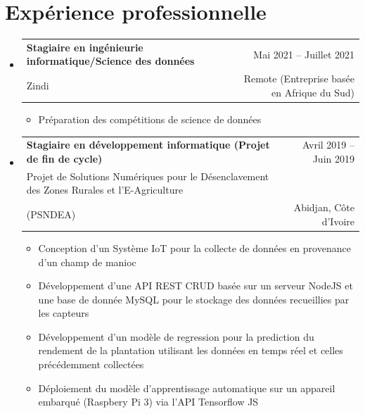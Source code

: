 \documentclass[A4,11pt]{article}
\makeatletter
\newcommand{\CVItem}[1]{
  \item\small{
    {#1 \vspace{-2pt}}
  }
}
\newcommand{\CVSubheading}[4]{
  \vspace{-2pt}\item
    \begin{tabular*}{0.97\textwidth}[t]{l@{\extracolsep{\fill}}r}
      \textbf{#1} & #2 \\
      \small#3 & \small #4 \\
    \end{tabular*}\vspace{-7pt}
}
\newcommand{\CVSubHeadingListStart}{\begin{itemize}[leftmargin=0.5cm, label={}]}
\newcommand{\CVSubHeadingListEnd}{\end{itemize}}
\newcommand{\CVItemListStart}{\begin{itemize}}
\newcommand{\CVItemListEnd}{\end{itemize}\vspace{-5pt}}
\makeatother
\begin{document}

\section{Expérience professionnelle}
\CVSubHeadingListStart

\CVSubheading
{Stagiaire en ingénieurie informatique/Science des données}{Mai 2021 -- Juillet 2021}
{Zindi}{Remote (Entreprise basée en Afrique du Sud)}
\CVItemListStart
\CVItem{Préparation des compétitions de science de données}
\CVItemListEnd

\CVSubheading
{Stagiaire en développement informatique (Projet de fin de cycle)}{Avril 2019 -- Juin 2019}
{Projet de Solutions Numériques pour le Désenclavement des Zones Rurales et l'E-Agriculture\\(PSNDEA)}{Abidjan, Côte d'Ivoire}

\CVItemListStart
\CVItem{Conception d'un Système IoT pour la collecte de données en provenance d'un champ de manioc}
\CVItem{Développement d'une API REST CRUD basée sur un serveur NodeJS et une base de donnée MySQL pour le stockage des données recueillies par les capteurs}
\CVItem{Développement d'un modèle de regression pour la prediction du rendement de la plantation utilisant les données en temps réel et celles précédemment collectées}
\CVItem{Déploiement du modèle d'apprentissage automatique sur un appareil embarqué (Raspbery Pi 3) via l'API Tensorflow JS}
\CVItemListEnd
\CVSubHeadingListEnd

\end{document}
